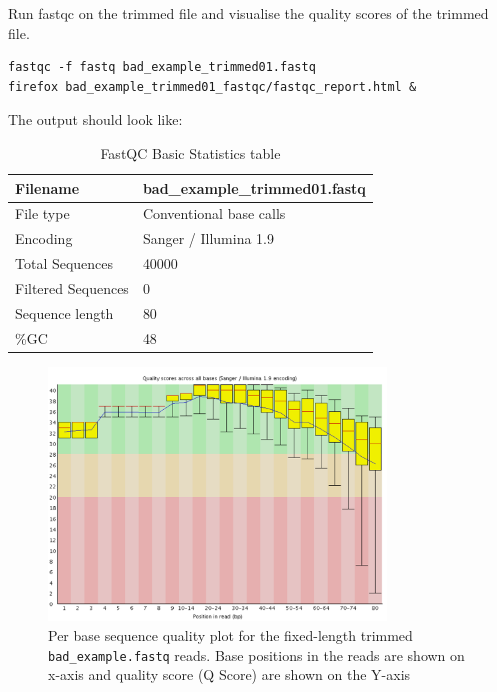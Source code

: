 \begin{steps}
Run fastqc on the trimmed file and visualise the quality scores of the trimmed file.
\begin{lstlisting}
fastqc -f fastq bad_example_trimmed01.fastq
firefox bad_example_trimmed01_fastqc/fastqc_report.html &
\end{lstlisting}

The output should look like:

\begin{table}[H]
  \centering
  \caption{FastQC Basic Statistics table}
    \begin{tabular}{ll}
    \toprule
    Filename & bad\_example\_trimmed01.fastq\\
    \midrule
    File type & Conventional base calls\\
    Encoding & Sanger / Illumina 1.9\\
    Total Sequences & 40000\\
    Filtered Sequences & 0\\
    Sequence length & 80\\
    \%GC & 48\\
    \bottomrule
    \end{tabular}%
  \label{tab:badexampletrimmed}%
\end{table}%

\begin{figure}[H]
\centering
\includegraphics[width=0.8\textwidth]{ngs-qc/bad_example_trimmed_to_80bp.png}
\caption{Per base sequence quality plot for the fixed-length trimmed \texttt{bad\_example.fastq} reads. Base positions in the reads are shown on x-axis and quality score (Q Score) are shown on the Y-axis}
\label{fig:bad_example_trimmed_plot}
\end{figure}

\end{steps}

